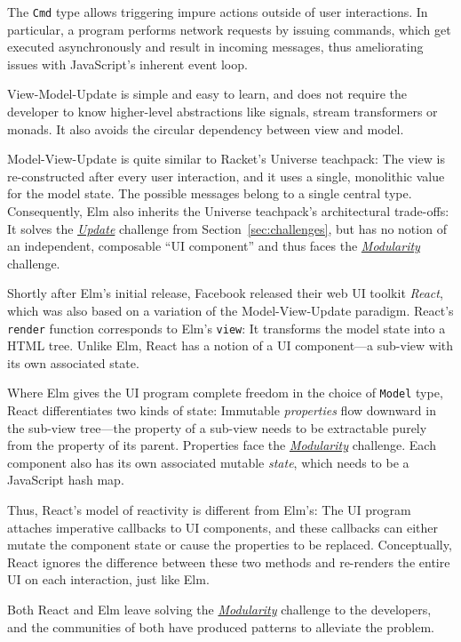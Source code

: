 \documentclass[sigplan,screen]{acmart}
\begin{document}
The \texttt{Cmd} type allows triggering impure actions outside of user
interactions.  In particular, a program performs network requests by
issuing commands, which get executed asynchronously and result in
incoming messages, thus ameliorating issues with JavaScript's
inherent event loop.

View-Model-Update is simple and easy to
learn, and does not require the developer to know higher-level
abstractions like signals, stream transformers or monads.  It also
avoids the circular dependency between view and model.

Model-View-Update is quite similar to Racket's
Universe teachpack: The view is re-constructed after every user
interaction, and it uses a single, monolithic value for the model
state.  The possible messages belong to a
single central type.
Consequently, Elm also inherits the Universe teachpack's architectural
trade-offs: It solves the \hyperlink{challenge:update}{\textit{Update}} challenge from Section~\ref{sec:challenges},
but has no notion of an
independent, composable ``UI component'' and thus faces the
\hyperlink{challenge:modularity}{\textit{Modularity}} challenge.

Shortly after Elm's initial release, Facebook released their web UI
toolkit \textit{React}, which was also based on a variation of the
Model-View-Update paradigm.
React's \texttt{render} function corresponds to Elm's \texttt{view}:
It transforms the model state into a HTML tree.  Unlike Elm,
React has a notion of a UI component---a sub-view with its
own associated state.

Where Elm gives the UI program complete freedom in the choice of
\texttt{Model} type, React differentiates two kinds of state:
Immutable \textit{properties} flow downward in the sub-view
tree---the property of a sub-view needs to be extractable purely from the
property of its parent.  Properties face the
\hyperlink{challenge:modularity}{\textit{Modularity}} challenge.
Each component also has its own associated mutable \textit{state},
which needs to be a JavaScript hash map.

Thus, React's model of reactivity is different from Elm's: The UI
program attaches imperative callbacks to UI components, and these
callbacks can either mutate the component state or cause the
properties to be replaced.  Conceptually, React ignores the difference
between these two methods and re-renders the entire UI on each
interaction, just like Elm.

Both React and Elm leave solving the
\hyperlink{challenge:modularity}{\textit{Modularity}} challenge to the
developers, and the communities of both have produced patterns to
alleviate the problem.
\end{document}
